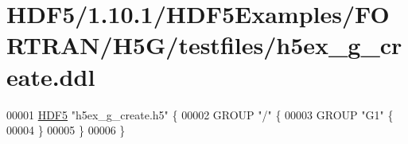 \hypertarget{_h_d_f5_21_810_81_2_h_d_f5_examples_2_f_o_r_t_r_a_n_2_h5_g_2testfiles_2h5ex__g__create_8ddl_source}{}\section{H\+D\+F5/1.10.1/\+H\+D\+F5\+Examples/\+F\+O\+R\+T\+R\+A\+N/\+H5\+G/testfiles/h5ex\+\_\+g\+\_\+create.ddl}
\label{_h_d_f5_21_810_81_2_h_d_f5_examples_2_f_o_r_t_r_a_n_2_h5_g_2testfiles_2h5ex__g__create_8ddl_source}

\begin{DoxyCode}
00001 \hyperlink{namespace_h_d_f5}{HDF5} \textcolor{stringliteral}{"h5ex\_g\_create.h5"} \{
00002 GROUP \textcolor{stringliteral}{"/"} \{
00003    GROUP \textcolor{stringliteral}{"G1"} \{
00004    \}
00005 \}
00006 \}
\end{DoxyCode}
